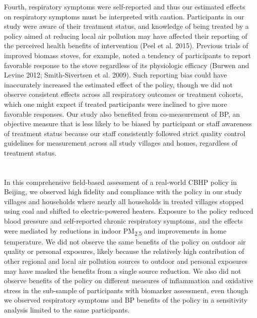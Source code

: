 \documentclass[
  letterpaper,
  DIV=11,
  numbers=noendperiod]{scrartcl}
\providecommand{\DIFaddtex}[1]{{\protect\color{blue}\uwave{#1}}} %
\providecommand{\DIFaddbegin}{} %
\providecommand{\DIFaddend}{} %
\providecommand{\DIFdelbegin}{} %
\providecommand{\DIFdelend}{} %
\providecommand{\DIFadd}[1]{\texorpdfstring{\DIFaddtex{#1}}{#1}} %
\newcommand{\DIFscaledelfig}{0.5}
\newlength{\DIFdelgraphicswidth} %
\newlength{\DIFdelgraphicsheight} %
\newcommand{\DIFaddincludegraphics}[2][]{{\color{blue}\fbox{\DIFOincludegraphics[#1]{#2}}}} %
\newcommand{\DIFdelincludegraphics}[2][]{%
\sbox{\DIFdelgraphicsbox}{\DIFOincludegraphics[#1]{#2}}%
\settoboxwidth{\DIFdelgraphicswidth}{\DIFdelgraphicsbox} %
\settoboxtotalheight{\DIFdelgraphicsheight}{\DIFdelgraphicsbox} %
\scalebox{\DIFscaledelfig}{%
\parbox[b]{\DIFdelgraphicswidth}{\usebox{\DIFdelgraphicsbox}\\[-\baselineskip] \rule{\DIFdelgraphicswidth}{0em}}\llap{\resizebox{\DIFdelgraphicswidth}{\DIFdelgraphicsheight}{%
\setlength{\unitlength}{\DIFdelgraphicswidth}%
\begin{picture}(1,1)%
\thicklines\linethickness{2pt} %
{\color[rgb]{1,0,0}\put(0,0){\framebox(1,1){}}}%
{\color[rgb]{1,0,0}\put(0,0){\line( 1,1){1}}}%
{\color[rgb]{1,0,0}\put(0,1){\line(1,-1){1}}}%
\end{picture}%
}\hspace*{3pt}}} %
} %
\DeclareRobustCommand{\DIFaddbegin}{\DIFOaddbegin \let\includegraphics\DIFaddincludegraphics} %
\DeclareRobustCommand{\DIFaddend}{\DIFOaddend \let\includegraphics\DIFOincludegraphics} %
\DeclareRobustCommand{\DIFdelbegin}{\DIFOdelbegin \let\includegraphics\DIFdelincludegraphics} %
\DeclareRobustCommand{\DIFdelend}{\DIFOaddend \let\includegraphics\DIFOincludegraphics} %
\begin{document}
Fourth, respiratory symptoms were self-reported and thus our estimated
effects on respiratory symptoms must be interpreted with caution.
Participants in our study were aware of their treatment status, and
knowledge of being treated by a policy aimed at reducing local air
pollution may have affected their reporting of the perceived health
benefits of intervention (Peel et al. 2015). Previous trials of improved
biomass stoves, for example, noted a tendency of participants to report
favorable response to the stove regardless of its physiologic efficacy
(Burwen and Levine 2012; Smith-Sivertsen et al. 2009). Such reporting
bias could have inaccurately increased the estimated effect of the
policy, though we did not observe consistent effects across all
respiratory outcomes or treatment cohorts, which one might expect if
treated participants were inclined to give more favorable responses. Our
study also benefited from co-measurement of BP, an objective measure
that is less likely to be biased by participant or staff awareness of
treatment status because our staff consistently followed strict quality
control guidelines for measurement across all study villages and homes,
regardless of treatment status.

\DIFdelbegin %
\DIFdelend \DIFaddbegin \section{\DIFadd{Implications of Findings}}\label{implications-of-findings}
\DIFaddend 

In this comprehensive field-based assessment of a real-world CBHP policy
in Beijing, we observed high fidelity and compliance with the policy in
our study villages and households where nearly all households in treated
villages stopped using coal and shifted to electric-powered heaters.
Exposure to the policy reduced blood pressure and self-reported chronic
respiratory symptoms, and the effects were mediated by reductions in
indoor PM\textsubscript{2.5} and improvements in home temperature. We
did not observe the same benefits of the policy on outdoor air quality
or personal exposures, likely because the relatively high contribution
of other regional and local air pollution sources to outdoor and
personal exposures may have masked the benefits from a single source
reduction. We also did not observe benefits of the policy on different
measures of inflammation and oxidative stress in the sub-sample of
participants with biomarker assessment, even though we observed
respiratory symptoms and BP benefits of the policy in a sensitivity
analysis limited to the same participants.
\end{document}

